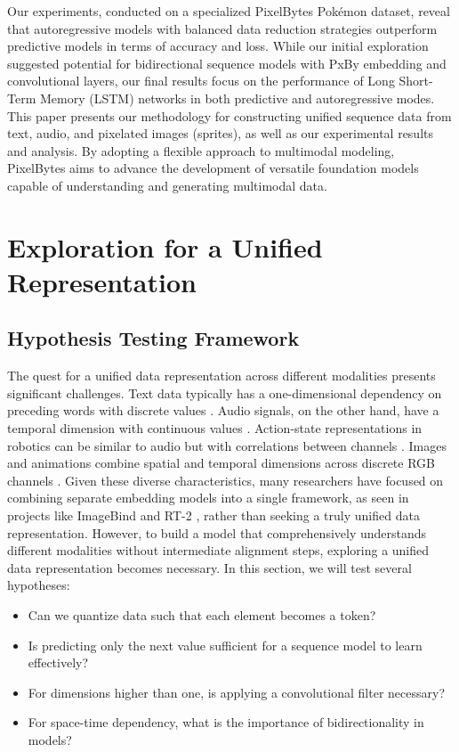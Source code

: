 \documentclass[10pt,a4paper]{article}
\begin{document}
Our experiments, conducted on a specialized PixelBytes Pokémon dataset, reveal that autoregressive models with balanced data reduction strategies outperform predictive models in terms of accuracy and loss. While our initial exploration suggested potential for bidirectional sequence models with PxBy embedding and convolutional layers, our final results focus on the performance of Long Short-Term Memory (LSTM) networks in both predictive and autoregressive modes. This paper presents our methodology for constructing unified sequence data from text, audio, and pixelated images (sprites), as well as our experimental results and analysis. By adopting a flexible approach to multimodal modeling, PixelBytes aims to advance the development of versatile foundation models capable of understanding and generating multimodal data.

\section{Exploration for a Unified Representation}

\subsection{Hypothesis Testing Framework}

The quest for a unified data representation across different modalities presents significant challenges. Text data typically has a one-dimensional dependency on preceding words with discrete values \cite{bengio2003neural}. Audio signals, on the other hand, have a temporal dimension with continuous values \cite{van2016wavenet}. Action-state representations in robotics can be similar to audio but with correlations between channels \cite{botteghi2021low}. Images and animations combine spatial and temporal dimensions across discrete RGB channels \cite{krizhevsky2012imagenet}. Given these diverse characteristics, many researchers have focused on combining separate embedding models into a single framework, as seen in projects like ImageBind \cite{girdhar2023imagebind} and RT-2 \cite{zitkovich2023rt}, rather than seeking a truly unified data representation. However, to build a model that comprehensively understands different modalities without intermediate alignment steps, exploring a unified data representation becomes necessary. In this section, we will test several hypotheses:

\begin{itemize}
    \item Can we quantize data such that each element becomes a token? \cite{zhan2022auto}
    \item Is predicting only the next value sufficient for a sequence model to learn effectively?
    \item For dimensions higher than one, is applying a convolutional filter necessary?
    \item For space-time dependency, what is the importance of bidirectionality in models?
\end{itemize}
\end{document}
